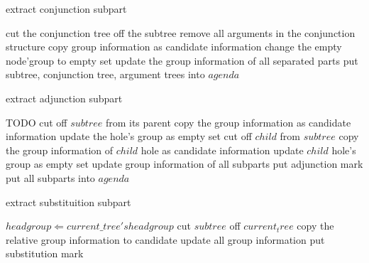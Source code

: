 \documentclass[a4paper]{article}
\begin{document}
\begin{algorithm}
    \caption{extract conjunction subpart}
    \label{alg:extract_conj}
    \begin{algorithmic}[1]
                \STATE cut the conjunction tree off the subtree
                \STATE remove all arguments in the conjunction structure
                \STATE copy group information as candidate information
                \STATE change the empty node'group to empty set
                \STATE update the group information of all separated parts 
                \STATE put subtree, conjunction tree, argument trees into $agenda$
            \ENDIF
        \ENDFOR
    \end{algorithmic}
\end{algorithm}

\begin{algorithm}
    \caption{extract adjunction subpart}
    \label{alg:extract_adj}
    \begin{algorithmic}[1]
                \STATE TODO
                        \STATE cut off $subtree$ from its parent
                        \STATE copy the group information as candidate information
                        \STATE update the hole's group as empty set
                        \STATE cut off $child$ from $subtree$
                        \STATE copy the group information of $child$ hole as candidate information
                        \STATE update $child$ hole's group as empty set
                        \STATE update group information of all subparts
                        \STATE put adjunction mark
                        \STATE put all subparts into $agenda$
                    \ENDIF
                \ENDIF
            \ENDFOR
        \ENDFOR
    \end{algorithmic}
\end{algorithm}

\begin{algorithm}
    \caption{extract substituition subpart}
    \label{alg:extract_sub}
    \begin{algorithmic}[1]
        \STATE $headgroup \Leftarrow current\_tree's head group$
            \STATE cut $subtree$ off $current_tree$
            \STATE copy the relative group information to candidate
            \STATE update all group information
            \STATE put substitution mark
        \ENDIF
        \ENDFOR
    \end{algorithmic}
\end{algorithm}
\end{document}
